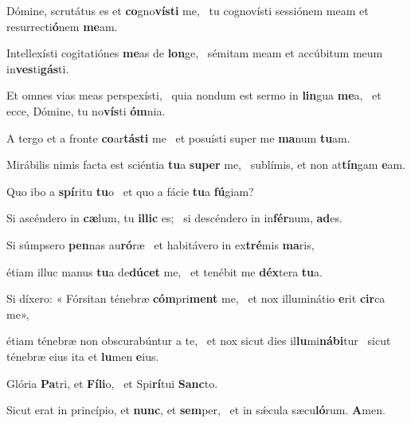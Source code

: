 \item Dómine, scrutátus es et \textbf{co}gno\textbf{vís}\textbf{ti} me,~\psstar{} tu cognovísti sessiónem meam et resurrecti\textbf{ó}nem \textbf{me}am.

\item Intellexísti cogitatiónes \textbf{me}as de \textbf{lon}ge,~\psstar{} sémitam meam et accúbitum meum in\textbf{ves}ti\textbf{gás}ti.

\item Et omnes vias meas perspexísti,~\pscross{} quia nondum est sermo in \textbf{lin}gua \textbf{me}a,~\psstar{} et ecce, Dómine, tu no\textbf{vís}ti \textbf{óm}nia.

\item A tergo et a fronte \textbf{co}ar\textbf{tás}\textbf{ti} me~\psstar{} et posuísti super me \textbf{ma}num \textbf{tu}am.

\item Mirábilis nimis facta est sciéntia \textbf{tu}a \textbf{su}\textbf{per} me,~\psstar{} sublímis, et non at\textbf{tín}gam \textbf{e}am.

\item Quo ibo a \textbf{spí}ritu \textbf{tu}o~\psstar{} et quo a fácie \textbf{tu}a \textbf{fú}giam?

\item Si ascéndero in \textbf{cæ}lum, tu \textbf{il}\textbf{lic} es;~\psstar{} si descéndero in in\textbf{fér}num, \textbf{ad}es.

\item Si súmpsero \textbf{pen}nas au\textbf{ró}ræ~\psstar{} et habitávero in ex\textbf{tré}mis \textbf{ma}ris,

\item étiam illuc manus \textbf{tu}a de\textbf{dú}\textbf{cet} me,~\psstar{} et tenébit me \textbf{déx}tera \textbf{tu}a.

\item Si díxero: « Fórsitan ténebræ \textbf{cóm}pri\textbf{ment} me,~\psstar{} et nox illuminátio \textbf{e}rit \textbf{cir}ca me»,

\item étiam ténebræ non obscurabúntur a te,~\pscross{} et nox sicut dies il\textbf{lu}mi\textbf{ná}\textbf{bi}tur~\psstar{} sicut ténebræ eius ita et \textbf{lu}men \textbf{e}ius.

\item Glória \textbf{Pa}tri, et \textbf{Fí}\textbf{li}o,~\psstar{} et Spi\textbf{rí}tui \textbf{Sanc}to.

\item Sicut erat in princípio, et \textbf{nunc}, et \textbf{sem}per,~\psstar{} et in sǽcula sæcu\textbf{ló}rum. \textbf{A}men.
